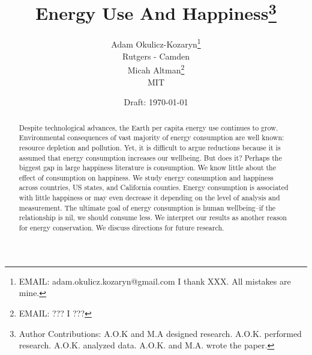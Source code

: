 \documentclass[10pt, letterpaper]{article}
\date{Draft: {}\today}
\title{
Energy Use And Happiness\footnote{Author Contributions: A.O.K and M.A designed
  research. A.O.K. performed research. A.O.K. analyzed data. A.O.K. and
  M.A. wrote the paper.  %
}
}
\author{
Adam Okulicz-Kozaryn\thanks{EMAIL: adam.okulicz.kozaryn@gmail.com
  \hfill I thank XXX.  All mistakes are mine.} \\
{\small Rutgers - Camden}\\
Micah Altman\thanks{EMAIL: ???
  \hfill I ???} \\
{\small MIT}
}
\begin{document}


\maketitle
\vspace{-.4in}
\begin{center}

\end{center}

\begin{abstract}
\noindent Despite technological advances, the Earth per capita energy use
continues to grow. %
Environmental consequences of vast majority of energy consumption are well known:
resource depletion and pollution. Yet, it is difficult to argue reductions
because it is assumed that energy consumption increases our wellbeing. But does
it?  Perhaps the biggest gap in large happiness literature is
consumption. We know little about the effect of consumption on happiness. %
We study energy consumption and happiness
across countries, US states, and California counties. Energy consumption
 is associated with  little happiness or may even decrease it depending on the level
of analysis and  measurement. %
 The ultimate goal of energy consumption is human wellbeing--if the 
 relationship is nil,  we should consume less.  We interpret our results as another reason for energy conservation. We discuss directions for future research.
\end{abstract}
\end{document}
